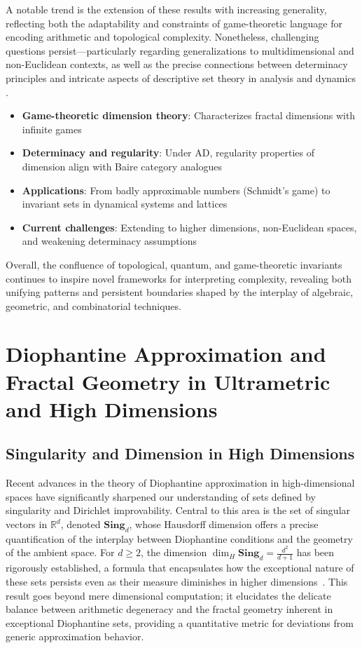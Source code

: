 A notable trend is the extension of these results with increasing generality, reflecting both the adaptability and constraints of game-theoretic language for encoding arithmetic and topological complexity. Nonetheless, challenging questions persist—particularly regarding generalizations to multidimensional and non-Euclidean contexts, as well as the precise connections between determinacy principles and intricate aspects of descriptive set theory in analysis and dynamics \cite{ref80}.

\begin{itemize}
    \item \textbf{Game-theoretic dimension theory}: Characterizes fractal dimensions with infinite games
    \item \textbf{Determinacy and regularity}: Under AD, regularity properties of dimension align with Baire category analogues
    \item \textbf{Applications}: From badly approximable numbers (Schmidt's game) to invariant sets in dynamical systems and lattices
    \item \textbf{Current challenges}: Extending to higher dimensions, non-Euclidean spaces, and weakening determinacy assumptions
\end{itemize}

Overall, the confluence of topological, quantum, and game-theoretic invariants continues to inspire novel frameworks for interpreting complexity, revealing both unifying patterns and persistent boundaries shaped by the interplay of algebraic, geometric, and combinatorial techniques.

\section{Diophantine Approximation and Fractal Geometry in Ultrametric and High Dimensions}

\subsection{Singularity and Dimension in High Dimensions}

Recent advances in the theory of Diophantine approximation in high-dimensional spaces have significantly sharpened our understanding of sets defined by singularity and Dirichlet improvability. Central to this area is the set of singular vectors in $\mathbb{R}^d$, denoted $\mathbf{Sing}_d$, whose Hausdorff dimension offers a precise quantification of the interplay between Diophantine conditions and the geometry of the ambient space. For $d \geq 2$, the dimension $\dim_H \mathbf{Sing}_d = \frac{d^2}{d+1}$ has been rigorously established, a formula that encapsulates how the exceptional nature of these sets persists even as their measure diminishes in higher dimensions~\cite{ref109}. This result goes beyond mere dimensional computation; it elucidates the delicate balance between arithmetic degeneracy and the fractal geometry inherent in exceptional Diophantine sets, providing a quantitative metric for deviations from generic approximation behavior.

